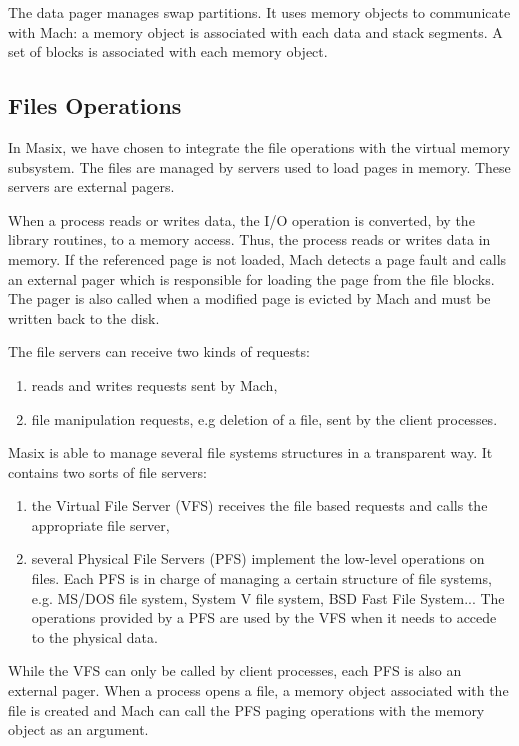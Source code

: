 	The data pager manages swap partitions. It uses memory objects to
communicate with Mach: a memory object is associated with each data and
stack segments. A set of blocks is associated with each memory object.

\subsection {Files Operations}
\label {subsection:files}

	In Masix, we have chosen to integrate the file operations with the
virtual memory subsystem. The files are managed by servers used to
load pages in memory. These servers are external pagers.

	When a process reads or writes data, the I/O operation is converted,
by the library routines, to a memory access. Thus, the process reads or
writes data in memory. If the referenced page is not loaded, Mach detects
a page fault and calls an external pager which is responsible for loading
the page from the file blocks. The pager is also called when a modified
page is evicted by Mach and must be written back to the disk.

	The file servers can receive two kinds of requests:
\begin {enumerate}
\item reads and writes requests sent by Mach,
\item file manipulation requests, e.g deletion of a file, sent by the
client processes.
\end {enumerate}

	Masix is able to manage several file systems structures in a
transparent way. It contains two sorts of file servers:
\begin {enumerate}
\item the Virtual File Server (VFS) receives the file based requests and
calls the appropriate file server,
\item several Physical File Servers (PFS) implement the low-level operations
on files. Each PFS is in charge of managing a certain structure of file
systems, e.g. MS/DOS file system, System V file system, BSD Fast File System...
The operations provided by a PFS are used by the VFS when it needs to accede
to the physical data.
\end {enumerate}

	While the VFS can only be called by client processes, each PFS is also
an external pager. When a process opens a file, a memory object associated with
the file is created and Mach can call the PFS paging operations with the
memory object as an argument.

